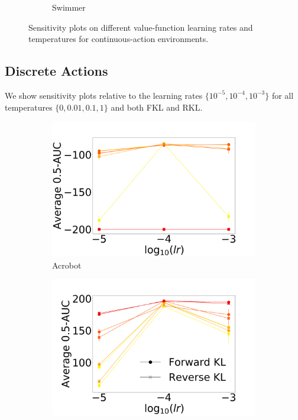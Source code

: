 \documentclass{article}
\begin{document}
\begin{figure}[!ht]
\begin{subfigure}[b]{0.3\linewidth}
    \caption{Swimmer}
    \label{fig:swimmer-pi}
  \end{subfigure}%
  \caption{Sensitivity plots on different value-function learning rates and temperatures for continuous-action environments.}
\end{figure}

\subsection{Discrete Actions}
We show sensitivity plots relative to the learning rates $\{10^{-5}, 10^{-4}, 10^{-3}\}$ for all temperatures $\{0, 0.01, 0.1, 1\}$ and both FKL and RKL.
\begin{figure}[!ht]
  \centering
  \begin{subfigure}[b]{0.25\linewidth}
    \centering
    \includegraphics[width=\columnwidth]{figs/deep/discrete/sensitivity/UNLABELED_kl_auc-0.5_Acrobot_lr_sensitivity.png} 
    \caption{Acrobot
    }\label{fig:acrobot}
  \end{subfigure}%
  \begin{subfigure}[b]{0.25\linewidth}
    \centering
    \includegraphics[width=\columnwidth]{figs/deep/discrete/sensitivity/kl_auc-0.5_CartPole_lr_sensitivity.png} 

\end{subfigure}
\end{figure}
\end{document}
